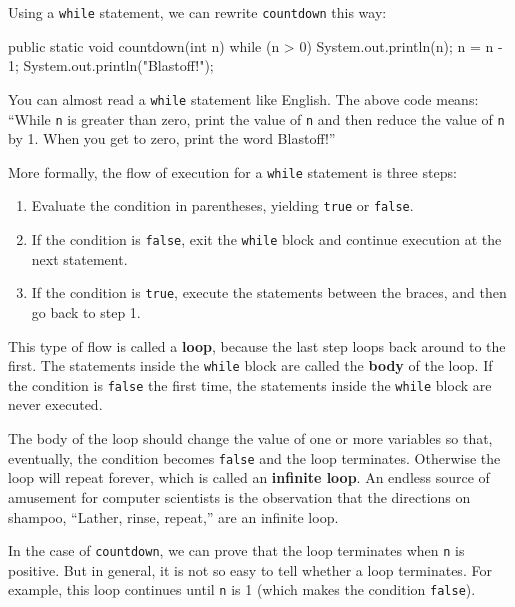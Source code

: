 \documentclass[12pt]{book}
\theoremstyle{exercise}
\newcommand{\java}[1]{\verb"#1"}
\newcommand{\java}[1]{\lstinline{#1}} %
\begin{document}
Using a \java{while} statement, we can rewrite \java{countdown} this way:

\begin{code}
    public static void countdown(int n) {
        while (n > 0) {
            System.out.println(n);
            n = n - 1;
        }
        System.out.println("Blastoff!");
    }
\end{code}

You can almost read a \java{while} statement like English.
The above code means: ``While \java{n} is greater than zero, print the value of \java{n} and then reduce the value of \java{n} by 1.
When you get to zero, print the word Blastoff!''

More formally, the flow of execution for a \java{while} statement is three steps:

\begin{enumerate}

\item Evaluate the condition in parentheses, yielding \java{true} or \java{false}.

\item If the condition is \java{false}, exit the \java{while} block and continue execution at the next statement.

\item If the condition is \java{true}, execute the statements between the braces, and then go back to step 1.

\end{enumerate}


This type of flow is called a {\bf loop}, because the last step loops back around to the first.
The statements inside the \java{while} block are called the {\bf body} of the loop.
If the condition is \java{false} the first time, the statements inside the \java{while} block are never executed.


The body of the loop should change the value of one or more variables so that, eventually, the condition becomes \java{false} and the loop terminates.
Otherwise the loop will repeat forever, which is called an {\bf infinite loop}.
An endless source of amusement for computer scientists is the observation that the directions on shampoo, ``Lather, rinse, repeat,'' are an infinite loop.

In the case of \java{countdown}, we can prove that the loop terminates when \java{n} is positive.
But in general, it is not so easy to tell whether a loop terminates.
For example, this loop continues until \java{n} is 1 (which makes the condition \java{false}).
\end{document}
